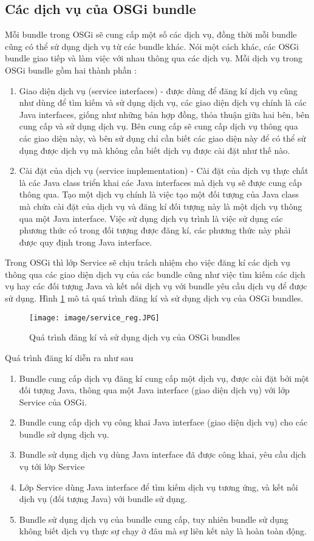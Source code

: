 \subsection{Các dịch vụ của OSGi bundle}
Mỗi bundle trong OSGi sẽ cung cấp một số các dịch vụ, đồng thời mỗi bundle cũng có thể sử dụng dịch vụ từ các bundle khác. Nói một cách khác, các OSGi bundle giao tiếp và làm việc với nhau thông qua các dịch vụ. Mỗi dịch vụ trong OSGi bundle gồm hai thành phần :
\begin{enumerate}
\item Giao diện dịch vụ (service interfaces) - được dùng để đăng kí dịch vụ cũng như dùng để tìm kiếm và sử dụng dịch vụ, các giao diện dịch vụ chính là các Java interfaces, giống như những bản hợp đồng, thỏa thuận giữa hai bên, bên cung cấp và sử dụng dịch vụ. Bên cung cấp sẽ cung cấp dịch vụ thông qua các giao diện này, và bên sử dụng chỉ cần biết các giao diện này để có thể sử dụng được dịch vụ mà không cần biết dịch vụ được cài đặt như thế nào.
\item Cài đặt của dịch vụ (service implementation) - Cài đặt của dịch vụ thực chất là các Java class triển khai các Java interfaces mà dịch vụ sẽ được cung cấp thông qua. Tạo một dịch vụ chính là việc tạo một đối tượng của Java class mà chứa cài đặt của dịch vụ và đăng kí đối tượng này là một dịch vụ thông qua một Java interface. Việc sử dụng dịch vụ trình là việc sử dụng các phương thức có trong đối tượng được đăng kí, các phương thức này phải được quy định trong Java interface.
\end{enumerate} 

Trong OSGi thì lớp Service sẽ chịu trách nhiệm cho việc đăng kí các dịch vụ thông qua các giao diện dịch vụ của các bundle cũng như việc tìm kiếm các dịch vụ hay các đối tượng Java và kết nối dịch vụ với bundle yêu cầu dịch vụ để được sử dụng.
Hình \ref{fig:service_reg} mô tả quá trình đăng kí và sử dụng dịch vụ của OSGi bundles.
\begin{figure}[htbp]
	\centering
		\texttt{[image: image/service\_reg.JPG]}
	\caption{Quá trình đăng kí và sử dụng dịch vụ của OSGi bundles}
	\label{fig:service_reg}
\end{figure}

Quá trình đăng kí diễn ra như sau 
\begin{enumerate}
\item Bundle cung cấp dịch vụ đăng kí cung cấp một dịch vụ, được cài đặt bởi một đối tượng Java, thông qua một Java interface (giao diện dịch vụ) với lớp Service của OSGi.
\item Bundle cung cấp dịch vụ công khai Java interface (giao diện dịch vụ) cho các bundle sử dụng dịch vụ.
\item Bundle sử dụng dịch vụ dùng Java interface đã được công khai, yêu cầu dịch vụ tới lớp Service
\item Lớp Service dùng Java interface để tìm kiếm dịch vụ tương ứng, và kết nối dịch vụ (đối tượng Java) với bundle sử dụng.
\item Bundle sử dụng dịch vụ của bundle cung cấp, tuy nhiên bundle sử dụng không biết dịch vụ thực sự chạy ở đâu mà sự liên kết này là hoàn toàn động.
\end{enumerate} 

